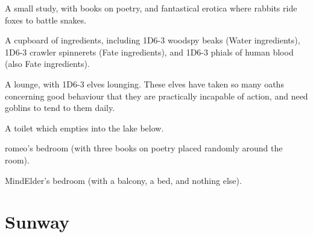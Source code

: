 \begin{multicols}{2}
\begin{dlist}
  \item
  A small study, with books on poetry, and fantastical erotica where rabbits ride foxes to battle snakes.
  \item
  A cupboard of \glspl{ingredient}, including 1D6-3 woodspy beaks (Water \glspl{ingredient}), 1D6-3 \gls{crawler} spinnerets (Fate \glspl{ingredient}), and 1D6-3 phials of human blood (also Fate \glspl{ingredient}).
  \item
  A lounge, with 1D6-3 elves lounging.
  These elves have taken so many oaths concerning good behaviour that they are practically incapable of action, and need goblins to tend to them daily.
  \item
  A toilet which empties into the lake below.
  \item
  \gls{romeo}'s bedroom (with three books on poetry placed randomly around the room).
  \item
  \gls{MindElder}'s bedroom (with a balcony, a bed, and nothing else).
\end{dlist}

\end{multicols}

\section{Sunway}


